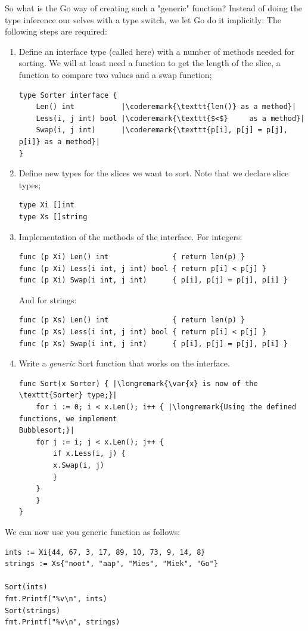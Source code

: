 So what is the Go way of creating such a "generic" function? 
Instead of doing the type inference our selves with a type switch, we let
Go do it implicitly:
The following steps are required:
\begin{enumerate}
\item Define an interface type (called  here) with a number of 
methods needed for sorting.
We will at least need a function to get the length of the slice,
a function to compare two values and a swap function;
\begin{lstlisting}
type Sorter interface {
    Len() int           |\coderemark{\texttt{len()} as a method}|
    Less(i, j int) bool |\coderemark{\texttt{$<$}     as a method}|
    Swap(i, j int)      |\coderemark{\texttt{p[i], p[j] = p[j], p[i]} as a method}|
}
\end{lstlisting}
\item Define new types for the slices we want to sort. Note that we
declare slice types;
\begin{lstlisting}
type Xi []int
type Xs []string
\end{lstlisting}
\item Implementation of the methods of the  interface.
For integers:
\begin{lstlisting}
func (p Xi) Len() int               { return len(p) }
func (p Xi) Less(i int, j int) bool { return p[i] < p[j] }
func (p Xi) Swap(i int, j int)      { p[i], p[j] = p[j], p[i] }
\end{lstlisting}
And for strings:
\begin{lstlisting}
func (p Xs) Len() int               { return len(p) }
func (p Xs) Less(i int, j int) bool { return p[i] < p[j] }
func (p Xs) Swap(i int, j int)      { p[i], p[j] = p[j], p[i] }
\end{lstlisting}
\item Write a \emph{generic} Sort function that works on the  interface.
\begin{lstlisting}
func Sort(x Sorter) { |\longremark{\var{x} is now of the \texttt{Sorter} type;}|
    for i := 0; i < x.Len(); i++ { |\longremark{Using the defined functions, we implement
Bubblesort;}|
	for j := i; j < x.Len(); j++ {
	    if x.Less(i, j) {
		x.Swap(i, j)
	    }
	}
    }
}
\end{lstlisting}
\end{enumerate}
We can now use you generic  function as follows:
\begin{lstlisting}
ints := Xi{44, 67, 3, 17, 89, 10, 73, 9, 14, 8}
strings := Xs{"noot", "aap", "Mies", "Miek", "Go"}

Sort(ints)
fmt.Printf("%v\n", ints)
Sort(strings)
fmt.Printf("%v\n", strings)
\end{lstlisting}

